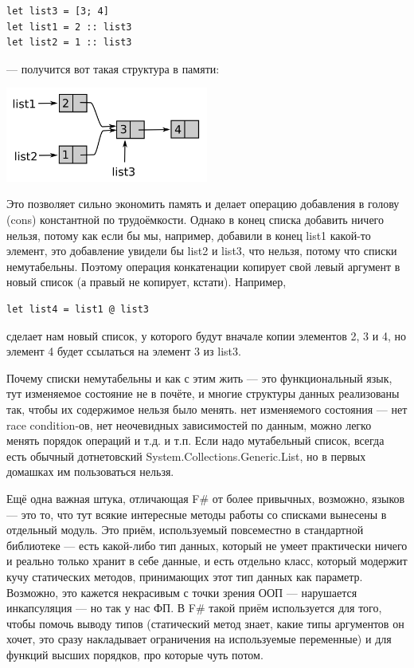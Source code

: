 \documentclass[a5paper]{article}
\begin{document}
\begin{verbatim}
let list3 = [3; 4]
let list1 = 2 :: list3
let list2 = 1 :: list3
\end{verbatim}

--- получится вот такая структура в памяти:

\begin{center}
	\includegraphics[width=0.5\textwidth]{lists.png}
\end{center}

Это позволяет сильно экономить память и делает операцию добавления в голову (cons) константной по трудоёмкости. Однако в конец списка добавить ничего нельзя, потому как если бы мы, например, добавили в конец list1 какой-то элемент, это добавление увидели бы list2 и list3, что нельзя, потому что списки немутабельны. Поэтому операция конкатенации копирует свой левый аргумент в новый список (а правый не копирует, кстати). Например, 

\begin{verbatim}
let list4 = list1 @ list3
\end{verbatim}

сделает нам новый список, у которого будут вначале копии элементов 2, 3 и 4, но элемент 4 будет ссылаться на элемент 3 из list3.

Почему списки немутабельны и как с этим жить --- это функциональный язык, тут изменяемое состояние не в почёте, и многие структуры данных реализованы так, чтобы их содержимое нельзя было менять. нет изменяемого состояния --- нет race condition-ов, нет неочевидных зависимостей по данным, можно легко менять порядок операций и т.д. и т.п. Если надо мутабельный список, всегда есть обычный дотнетовский System.Collections.Generic.List, но в первых домашках им пользоваться нельзя.

Ещё одна важная штука, отличающая F\# от более привычных, возможно, языков --- это то, что тут всякие интересные методы работы со списками вынесены в отдельный модуль. Это приём, используемый повсеместно в стандартной библиотеке --- есть какой-либо тип данных, который не умеет практически ничего и реально только хранит в себе данные, и есть отдельно класс, который модержит кучу статических методов, принимающих этот тип данных как параметр. Возможно, это кажется некрасивым с точки зрения ООП --- нарушается инкапсуляция --- но так у нас ФП. В F\# такой приём используется для того, чтобы помочь выводу типов (статический метод знает, какие типы аргументов он хочет, это сразу накладывает ограничения на используемые переменные) и для функций высших порядков, про которые чуть потом.
\end{document}
